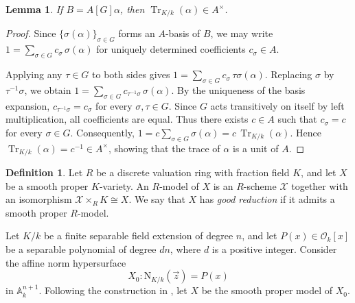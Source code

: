 \documentclass[10pt]{amsart}
\theoremstyle{plain}
\newtheorem{lemma}[thm]{Lemma}
\theoremstyle{definition}
\newtheorem{definition}[thm]{Definition}
\newcommand{\Nm}{\mathrm{N}}
\begin{document}
\begin{lemma}\label{Trace}
If $B=A[G]\alpha$, then $\operatorname{Tr}_{K/k}(\alpha)\in A^\times$.
\end{lemma}

\begin{proof}
Since $\{\sigma(\alpha)\}_{\sigma\in G}$ forms an $A$-basis of $B$, we may write
$1=\sum_{\sigma\in G}c_\sigma\,\sigma(\alpha)$
for uniquely determined coefficients $c_\sigma\in A$.

Applying any $\tau\in G$ to both sides gives
$1=\sum_{\sigma\in G}c_\sigma\,\tau\sigma(\alpha)$.
Replacing $\sigma$ by $\tau^{-1}\sigma$, we obtain
$1=\sum_{\sigma\in G}c_{\tau^{-1}\sigma}\,\sigma(\alpha)$.
By the uniqueness of the basis expansion, $c_{\tau^{-1}\sigma}=c_\sigma$ for every $\sigma,\tau\in G$. Since $G$ acts transitively on itself by left multiplication, all coefficients are equal. Thus there exists $c\in A$ such that $c_\sigma=c$ for every $\sigma\in G$. Consequently,
$1=c\sum_{\sigma\in G}\sigma(\alpha)=c\,\operatorname{Tr}_{K/k}(\alpha)$.
Hence $\operatorname{Tr}_{K/k}(\alpha)=c^{-1}\in A^\times$, showing that the trace of $\alpha$ is a unit of $A$.
\end{proof}
\begin{definition}
Let \(R\) be a discrete valuation ring with fraction field \(K\), and let
\(X\) be a smooth proper \(K\)-variety. An \(R\)-model of \(X\) is an \(R\)-scheme
\(\mathcal X\) together with an isomorphism \(\mathcal X\times_RK\cong X\). We say that \(X\) has \emph{good reduction} if it admits a smooth proper
\(R\)-model.
\end{definition}


Let $K/k$ be a finite separable field extension of degree $n$, and let
$P(x) \in \mathcal{O}_k[x]$ be a separable polynomial of degree $dn$, where
$d$ is a positive integer. Consider the affine norm hypersurface
\[
X_0: \Nm_{K/k}(\vec{z}) = P(x)
\]
in $\mathbb{A}^{n+1}_k$. Following the construction in \cite[Section~2]{AVB}, let $X$ be the smooth proper model of $X_0$.
\end{document}

